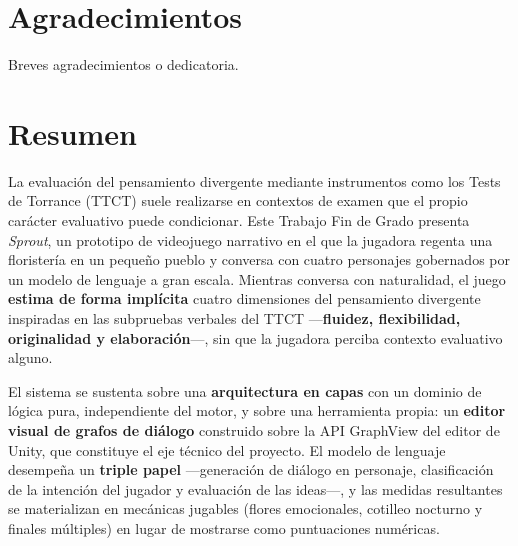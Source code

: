\documentclass[12pt,twoside,titlepage]{report}
\newcommand\blankpage{%
    \newpage
    \null
    \thispagestyle{empty}%
    \newpage}
\begin{document}
\hypersetup{pageanchor=true}

\normalsize
\afterpage{\blankpage} %


\setlength{\parskip}{0.75em}
\renewcommand{\baselinestretch}{1.25}

\setcounter{page}{2}


\chapter*{Agradecimientos}

Breves agradecimientos o dedicatoria.

\afterpage{\blankpage}



\chapter*{Resumen}

La evaluación del pensamiento divergente mediante instrumentos como los Tests de Torrance (TTCT) suele realizarse en contextos de examen que el propio carácter evaluativo puede condicionar. Este Trabajo Fin de Grado presenta \textit{Sprout}, un prototipo de videojuego narrativo en el que la jugadora regenta una floristería en un pequeño pueblo y conversa con cuatro personajes gobernados por un modelo de lenguaje a gran escala. Mientras conversa con naturalidad, el juego \textbf{estima de forma implícita} cuatro dimensiones del pensamiento divergente inspiradas en las subpruebas verbales del TTCT ---\textbf{fluidez, flexibilidad, originalidad y elaboración}---, sin que la jugadora perciba contexto evaluativo alguno.

El sistema se sustenta sobre una \textbf{arquitectura en capas} con un dominio de lógica pura, independiente del motor, y sobre una herramienta propia: un \textbf{editor visual de grafos de diálogo} construido sobre la API GraphView del editor de Unity, que constituye el eje técnico del proyecto. El modelo de lenguaje desempeña un \textbf{triple papel} ---generación de diálogo en personaje, clasificación de la intención del jugador y evaluación de las ideas---, y las medidas resultantes se materializan en mecánicas jugables (flores emocionales, cotilleo nocturno y finales múltiples) en lugar de mostrarse como puntuaciones numéricas.
\end{document}
